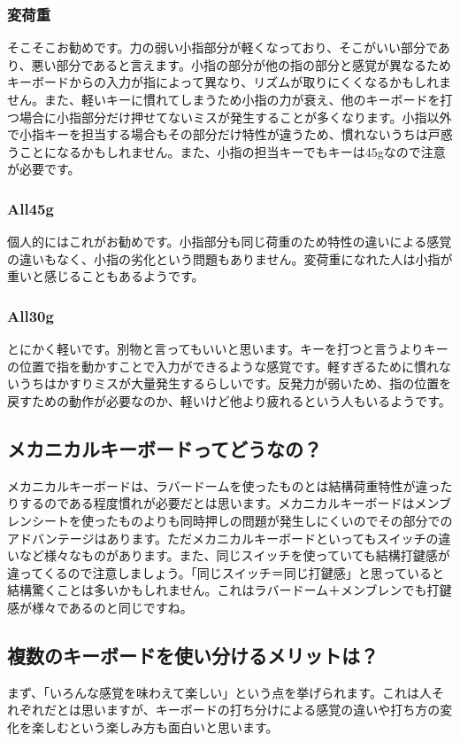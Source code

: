 \subsubsection*{変荷重}
そこそこお勧めです。力の弱い小指部分が軽くなっており、そこがいい部分であり、悪い部分であると言えます。小指の部分が他の指の部分と感覚が異なるためキーボードからの入力が指によって異なり、リズムが取りにくくなるかもしれません。また、軽いキーに慣れてしまうため小指の力が衰え、他のキーボードを打つ場合に小指部分だけ押せてないミスが発生することが多くなります。小指以外で小指キーを担当する場合もその部分だけ特性が違うため、慣れないうちは戸惑うことになるかもしれません。また、小指の担当キーでもキーは45gなので注意が必要です。

\subsubsection*{All45g}
個人的にはこれがお勧めです。小指部分も同じ荷重のため特性の違いによる感覚の違いもなく、小指の劣化という問題もありません。変荷重になれた人は小指が重いと感じることもあるようです。

\subsubsection*{All30g}
とにかく軽いです。別物と言ってもいいと思います。キーを打つと言うよりキーの位置で指を動かすことで入力ができるような感覚です。軽すぎるために慣れないうちはかすりミスが大量発生するらしいです。反発力が弱いため、指の位置を戻すための動作が必要なのか、軽いけど他より疲れるという人もいるようです。


\subsection{メカニカルキーボードってどうなの？}
メカニカルキーボードは、ラバードームを使ったものとは結構荷重特性が違ったりするのである程度慣れが必要だとは思います。メカニカルキーボードはメンブレンシートを使ったものよりも同時押しの問題が発生しにくいのでその部分でのアドバンテージはあります。ただメカニカルキーボードといってもスイッチの違いなど様々なものがあります。また、同じスイッチを使っていても結構打鍵感が違ってくるので注意しましょう。「同じスイッチ＝同じ打鍵感」と思っていると結構驚くことは多いかもしれません。これはラバードーム＋メンブレンでも打鍵感が様々であるのと同じですね。

\subsection{複数のキーボードを使い分けるメリットは？}
まず、「いろんな感覚を味わえて楽しい」という点を挙げられます。これは人それぞれだとは思いますが、キーボードの打ち分けによる感覚の違いや打ち方の変化を楽しむという楽しみ方も面白いと思います。

